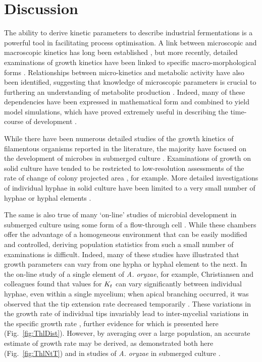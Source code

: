 \section{Discussion}

The ability to derive kinetic parameters to describe industrial fermentations is a powerful tool in facilitating process optimisation. A link between microscopic and macroscopic kinetics has long been established \cite{emerson1950, marshall1960}, but more recently, detailed examinations of growth kinetics have been linked to specific macro-morphological forms \cite{muller2002,muller2003,eypark2006}. Relationships between micro-kinetics and metabolic activity have also been identified, suggesting that knowledge of microscopic parameters is crucial to furthering an understanding of metabolite production \cite{carlsen1996a, agger1998, papagianni1999, papagianni2001}. Indeed, many of these dependencies have been expressed in mathematical form and combined to yield model simulations, which have proved extremely useful in describing the time-course of development \cite{agger1998, christiansen1999, jhkim2005, cross2004, li2000}.

While there have been numerous detailed studies of the growth kinetics of filamentous organisms reported in the literature, the majority have focused on the development of microbes in submerged culture \cite{carlsen1996a, spohr1997, agger1998, spohr1998, christiansen1999, muller2002, lubbehusen2003, bizukojc2006, eypark2006, pollack2008}. Examinations of growth on solid culture have tended to be restricted to low-resolution assessments of the rate of change of colony projected area \cite{cross2004, couri2006}, for example.  More detailed investigations of individual hyphae in solid culture have been limited to a very small number of hyphae or hyphal elements \cite{trinci1974,dieguez-uribeondo2005, rahardjo2005b}.

The same is also true of many \lq on-line' studies of microbial development in submerged culture using some form of a flow-through cell \cite{spohr1998, christiansen1999, muller2002, lubbehusen2003, eypark2006, pollack2008}. While these chambers offer the advantage of a homogeneous environment that can be easily modified and controlled, deriving population statistics from such a small number of examinations is difficult. Indeed, many of these studies have illustrated that growth parameters can vary from one hypha or hyphal element to the next. In the on-line study of a single element of \emph{A. oryzae}, for example, Christiansen and colleagues found that values for $K_t$ can vary significantly between individual hyphae, even within a single mycelium; when apical branching occurred, it was observed that the tip extension rate decreased temporarily \cite{spohr1998, christiansen1999}. These variations in the growth rate of individual tips invariably lead to inter-mycelial variations in the specific growth rate \cite{spohr1998}, further evidence for which is presented here (Fig.~\ref{fig:ThlDist}). However, by averaging over a large population, an accurate estimate of growth rate may be derived, as demonstrated both here (Fig.~\ref{fig:ThlNtT}) and in studies of \emph{A. oryzae} in submerged culture \cite{carlsen1996a, spohr1997}.

